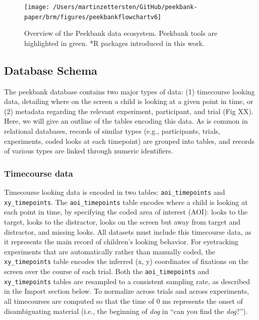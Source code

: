 \documentclass[
  english,
  man,floatsintext]{apa6}
\begin{document}
\begin{figure}

{\centering \texttt{[image: /Users/martinzettersten/GitHub/peekbank-paper/brm/figures/peekbankflowchartv6]} 

}

\caption{Overview of the Peekbank data ecosystem. Peekbank tools are highlighted in green. *R packages introduced in this work.}\label{fig:fig-framework-overview}
\end{figure}

\hypertarget{database-schema}{%
\subsection{Database Schema}\label{database-schema}}

The peekbank database contains two major types of data: (1) timecourse looking data, detailing where on the screen a child is looking at a given point in time, or (2) metadata regarding the relevant experiment, participant, and trial (Fig XX).
Here, we will give an outline of the tables encoding this data.
As is common in relational databases, records of similar types (e.g., participants, trials, experiments, coded looks at each timepoint) are grouped into tables, and records of various types are linked through numeric identifiers.

\hypertarget{timecourse-data}{%
\subsubsection{Timecourse data}\label{timecourse-data}}

Timecourse looking data is encoded in two tables: \texttt{aoi\_timepoints} and \texttt{xy\_timepoints}.
The \texttt{aoi\_timepoints} table encodes where a child is looking at each point in time, by specifying the coded area of interest (AOI): looks to the target, looks to the distractor, looks on the screen but away from target and distractor, and missing looks.
All datasets must include this timecourse data, as it represents the main record of children's looking behavior.
For eyetracking experiments that are automatically rather than manually coded, the \texttt{xy\_timepoints} table encodes the inferred (x, y) coordinates of fixations on the screen over the course of each trial.
Both the \texttt{aoi\_timepoints} and \texttt{xy\_timepoints} tables are resampled to a consistent sampling rate, as described in the Import section below.
To normalize across trials and across experiments, all timecourses are computed so that the time of 0 ms represents the onset of disambiguating material (i.e., the beginning of \textit{dog} in \enquote{can you find the \textit{dog}?}).
\end{document}
